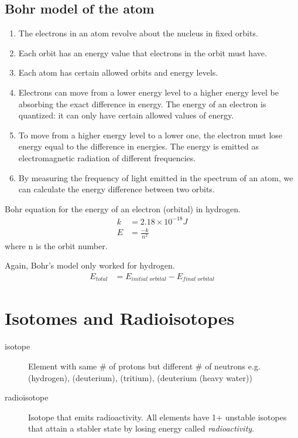 \documentclass[a4paper, 8pt]{memoir}
\begin{document}
\section{Bohr model of the atom}
\begin{enumerate}
\item The electrons in an atom revolve about the nucleus in fixed orbits.
\item Each orbit has an energy value that electrons in the orbit must have.
\item Each atom has certain allowed orbits and energy levels.
\item Electrons can move from a lower energy level to a higher energy level be absorbing the exact difference in energy. The energy of an electron is quantized: it can only have certain allowed values of energy.
\item To move from a higher energy level to a lower one, the electron must lose energy equal to the difference in energies. The energy is emitted as electromagnetic radiation of different frequencies.
\item By measuring the frequency of light emitted in the spectrum of an atom, we can calculate the energy difference between two orbits.
\end{enumerate}
Bohr equation for the energy of an electron (orbital) in hydrogen.
\begin{align}
k &= 2.18 \times 10^{-18} J \\
E &= \frac{-k}{n^{2}}
\end{align}
where n is the orbit number.

Again, Bohr's model only worked for hydrogen.
\begin{align}
E_\textit{total} &= E_\textit{initial orbital} - E_\textit{final orbital}
\end{align}
\chapter{Isotomes and Radioisotopes}
\begin{description}
\item[isotope] Element with same \# of protons but different \# of neutrons e.g.  (hydrogen),  (deuterium),  (tritium),  (deuterium (heavy water))
\item[radioisotope] Isotope that emits radioactivity. All elements have 1+ unstable isotopes that attain a stabler state by losing energy called \emph{radioactivity}.
\end{description}
\end{document}
